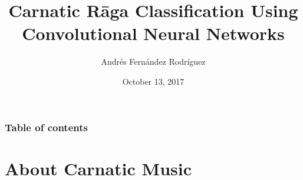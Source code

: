 \documentclass[hyperref={pdfpagelabels=false}]{beamer}
\title[Raaga Classification]{Carnatic R\=aga Classification Using\\Convolutional Neural Networks}
\author[Andr\'es Fern\'andez Rodr\'iguez]{Andr\'es Fern\'andez Rodr\'iguez}
\institute[]{Goethe Universit\"at Frankfurt am Main}
\date{October 13, 2017}
\begin{document}
     {\frame \titlepage}



     \begin{frame}
       \frametitle{Table of contents}
       \tableofcontents
     \end{frame}



     \section{About Carnatic Music}
     \frame{\sectionpage}
\end{document}
